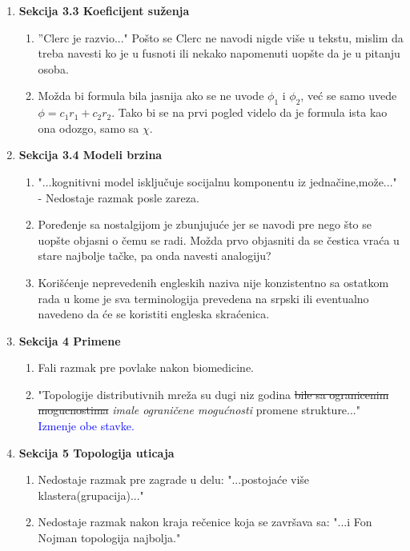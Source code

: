 \documentclass[a4paper]{report}
\newcommand{\odgovor}[1]{\textcolor{blue}{#1}}
\begin{document}
\begin{enumerate}
    \item \textbf{Sekcija 3.3 Koeficijent suženja}
    \begin{enumerate}
        \item ''Clerc je razvio..." Pošto se Clerc ne navodi nigde više u tekstu, mislim da treba navesti ko je u fusnoti ili nekako napomenuti uopšte da je u pitanju osoba.
        \item Možda bi formula bila jasnija ako se ne uvode $\phi_1$ i $\phi_2$, već se samo uvede $\phi=c_1r_1+c_2r_2$. Tako bi se na prvi pogled videlo da je formula ista kao ona odozgo, samo sa $\chi$.
    \end{enumerate}
    
    \item \textbf{Sekcija 3.4 Modeli brzina}
    \begin{enumerate}
        \item "...kognitivni model isključuje socijalnu komponentu iz jednačine,može..." - Nedostaje razmak posle zareza.
        \item Poređenje sa nostalgijom je zbunjujuće jer se navodi pre nego što se uopšte objasni o čemu se radi. Možda prvo objasniti da se čestica vraća u stare najbolje tačke, pa onda navesti analogiju?
        \item Korišćenje neprevedenih engleskih naziva nije konzistentno sa ostatkom rada u kome je sva terminologija prevedena na srpski ili eventualno navedeno da će se koristiti engleska skraćenica.
    \end{enumerate}
    
    \item \textbf{Sekcija 4 Primene}
    \begin{enumerate}
        \item Fali razmak pre povlake nakon biomedicine.
        \item "Topologije distributivnih mreža su dugi niz godina \st{bile sa ogranicenim mogucnostima} \textit{imale ograničene mogućnosti} promene strukture..."\\
        \odgovor{Izmenje obe stavke.}
    \end{enumerate}
    
    \item \textbf{Sekcija 5 Topologija uticaja}
    \begin{enumerate}
        \item Nedostaje razmak pre zagrade u delu: "...postojaće više klastera(grupacija)..."
        \item Nedostaje razmak nakon kraja rečenice koja se završava sa: "...i Fon Nojman topologija najbolja."
    \end{enumerate}
    
\end{enumerate}
\end{document}
